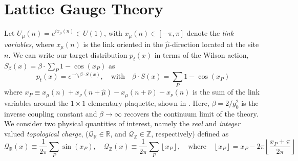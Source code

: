 \documentclass{article} %
\begin{document}
\section{\label{sec:lattice_gauge_theory}Lattice Gauge Theory}
%
%
Let \(U_{\mu}(n) = e^{i x_{\mu}(n)} \in U(1)\), with \(x_{\mu}(n) \in [-\pi,\pi]\) denote the \emph{link
variables}, where \(x_{\mu}(n)\) is the link oriented in the \(\hat{\mu}\)-direction located at the site
\(n\).
%
%
%
%
We can write our target distribution \(p_{t}(x)\) in terms of the Wilson action, \(S_{\beta}(x) =
\beta\cdot\sum_{P}1-\cos(x_{P})\) as
%
\begin{equation}
   p_{t}(x) = e^{-\gamma_{t}\beta\cdot S(x)},\quad\text{with}\quad \beta\cdot S(x) = \sum_{P}1 - \cos(x_{P})
   \label{eq:wilsonaction}
\end{equation}
%
where \(x_{P} \equiv x_{\mu}(n) + x_{\nu}(n+\hat{\mu}) - x_{\mu}(n+\hat{\nu}) -x_{\nu}(n)\) is the sum of the link
variables around the \(1\times1\) elementary plaquette, shown in .
%
Here, \(\beta = 2 / g_{0}^{2}\) is the inverse coupling constant and \(\beta\rightarrow\infty\) recovers the continuum
limit of the theory. 
%
We consider two physical quantities of interest, namely the \emph{real} and \emph{integer} valued \emph{topological
charge}, (\(\mathcal{Q}_{\mathbb{R}} \in \mathbb{R}\), and \(\mathcal{Q}_{\mathbb{Z}}\in\mathbb{Z}\), respectively)
defined as
%
\begin{equation*}
   \mathcal{Q}_{\mathbb{R}}(x) 
   \equiv \frac{1}{2\pi}\sum_{P}\sin(x_{P}),\quad%
      \mathcal{Q}_{\mathbb{Z}}(x) \equiv \frac{1}{2\pi}\sum_{P}\left\lfloor x_{P}\right\rfloor,
   \quad\text{where}\quad \left\lfloor x_{P}\right\rfloor = x_{P} -
   2\pi\left\lfloor\frac{x_{P}+\pi}{2\pi}\right\rfloor
\end{equation*}
%
\end{document}
